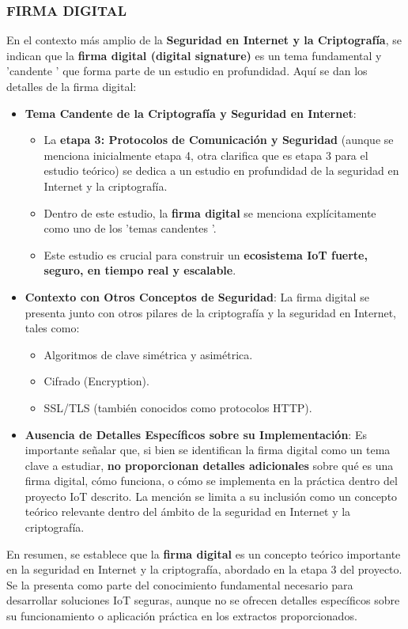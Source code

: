 \documentclass{report}
\begin{document}
\subsubsection{FIRMA DIGITAL}
En el contexto más amplio de la \textbf{Seguridad en Internet y la Criptografía}, se  indican que la \textbf{firma digital (digital 
signature)} es un tema fundamental y  'candente ' que forma parte de un estudio en profundidad. Aquí se dan los detalles de la firma digital:

\begin{itemize}
    \item \textbf{Tema Candente de la Criptografía y Seguridad en Internet}:
    \begin{itemize}
        \item La \textbf{etapa 3: Protocolos de Comunicación y Seguridad} (aunque se  menciona inicialmente etapa 4, otra clarifica que es 
        etapa 3 para el estudio teórico) se dedica a un estudio en profundidad de la seguridad en Internet y la criptografía.
        \item Dentro de este estudio, la \textbf{firma digital} se menciona explícitamente como uno de los  'temas candentes '.
        \item Este estudio es crucial para construir un \textbf{ecosistema IoT fuerte, seguro, en tiempo real y escalable}.
    \end{itemize}

    \item \textbf{Contexto con Otros Conceptos de Seguridad}: La firma digital se presenta junto con otros pilares de la criptografía y la seguridad 
    en Internet, tales como:
    \begin{itemize}
        \item Algoritmos de clave simétrica y asimétrica.
        \item Cifrado (Encryption).
        \item SSL/TLS (también conocidos como protocolos HTTP).
    \end{itemize}

    \item \textbf{Ausencia de Detalles Específicos sobre su Implementación}: Es importante señalar que, si bien se  identifican la firma 
    digital como un tema clave a estudiar, \textbf{no proporcionan detalles adicionales} sobre qué es una firma digital, cómo funciona, o cómo se 
    implementa en la práctica dentro del proyecto IoT descrito. La mención se limita a su inclusión como un concepto teórico relevante dentro del 
    ámbito de la seguridad en Internet y la criptografía.
\end{itemize}
En resumen, se  establece que la \textbf{firma digital} es un concepto teórico importante en la seguridad en Internet y la criptografía, 
abordado en la etapa 3 del proyecto. Se la presenta como parte del conocimiento fundamental necesario para desarrollar soluciones IoT seguras, 
aunque no se ofrecen detalles específicos sobre su funcionamiento o aplicación práctica en los extractos proporcionados.
\end{document}
